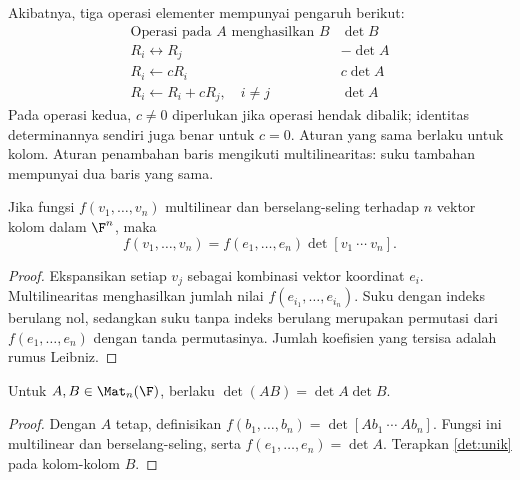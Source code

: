 Akibatnya, tiga operasi elementer mempunyai pengaruh berikut:
\[
      \begin{array}{c|c}
            \text{Operasi pada }A\text{ menghasilkan }B & \det B  \\ \hline
            R_i\leftrightarrow R_j                      & -\det A \\
            R_i\leftarrow cR_i                          & c\det A \\
            R_i\leftarrow R_i+cR_j,\quad i\ne j         & \det A
      \end{array}
\]
Pada operasi kedua, $c\ne0$ diperlukan jika operasi hendak dibalik;
identitas determinannya sendiri juga benar untuk $c=0$.
Aturan yang sama berlaku untuk kolom. Aturan penambahan baris mengikuti
multilinearitas: suku tambahan mempunyai dua baris yang sama.

\begin{lem}
      \label{det:unik}
      Jika fungsi $f(v_1,\ldots,v_n)$ multilinear dan berselang-seling
      terhadap $n$ vektor kolom dalam $\F^n$, maka
      \[
            f(v_1,\ldots,v_n)=f(e_1,\ldots,e_n)\det[v_1\ \cdots\ v_n].
      \]
\end{lem}
\begin{proof}
      Ekspansikan setiap $v_j$ sebagai kombinasi vektor koordinat $e_i$.
      Multilinearitas menghasilkan jumlah nilai $f(e_{i_1},\ldots,e_{i_n})$.
      Suku dengan indeks berulang nol, sedangkan suku tanpa indeks berulang
      merupakan permutasi dari $f(e_1,\ldots,e_n)$ dengan tanda permutasinya.
      Jumlah koefisien yang tersisa adalah rumus Leibniz.
\end{proof}

\begin{thm}
      \label{det:produk}
      Untuk $A,B\in\Mat_n(\F)$, berlaku $\det(AB)=\det A\det B$.
\end{thm}
\begin{proof}
      Dengan $A$ tetap, definisikan
      $f(b_1,\ldots,b_n)=\det[Ab_1\ \cdots\ Ab_n]$.
      Fungsi ini multilinear dan berselang-seling, serta
      $f(e_1,\ldots,e_n)=\det A$.
      Terapkan \autoref{det:unik} pada kolom-kolom $B$.
\end{proof}

